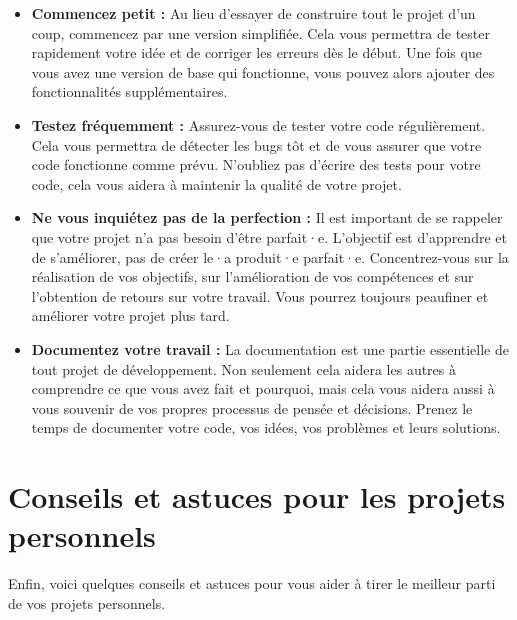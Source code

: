 \begin{itemize}
    \item \textbf{Commencez petit :} Au lieu d'essayer de construire tout le projet d'un coup, commencez par une version simplifiée. Cela vous permettra de tester rapidement votre idée et de corriger les erreurs dès le début. Une fois que vous avez une version de base qui fonctionne, vous pouvez alors ajouter des fonctionnalités supplémentaires.

    \item \textbf{Testez fréquemment :} Assurez-vous de tester votre code régulièrement. Cela vous permettra de détecter les bugs tôt et de vous assurer que votre code fonctionne comme prévu. N'oubliez pas d'écrire des tests pour votre code, cela vous aidera à maintenir la qualité de votre projet.

    \item \textbf{Ne vous inquiétez pas de la perfection :} Il est important de se rappeler que votre projet n'a pas besoin d'être parfait·e. L'objectif est d'apprendre et de s'améliorer, pas de créer le·a produit·e parfait·e. Concentrez-vous sur la réalisation de vos objectifs, sur l'amélioration de vos compétences et sur l'obtention de retours sur votre travail. Vous pourrez toujours peaufiner et améliorer votre projet plus tard.

    \item \textbf{Documentez votre travail :} La documentation est une partie essentielle de tout projet de développement. Non seulement cela aidera les autres à comprendre ce que vous avez fait et pourquoi, mais cela vous aidera aussi à vous souvenir de vos propres processus de pensée et décisions. Prenez le temps de documenter votre code, vos idées, vos problèmes et leurs solutions.
\end{itemize}

\section{Conseils et astuces pour les projets personnels}

Enfin, voici quelques conseils et astuces pour vous aider à tirer le meilleur parti de vos projets personnels.

